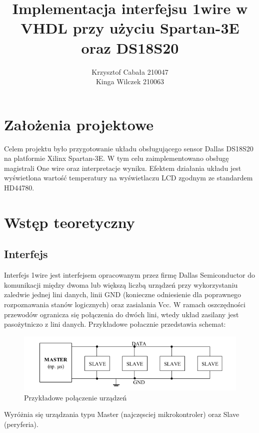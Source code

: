 \documentclass[a4paper]{article}
\title{\vspace{80mm}Implementacja interfejsu 1wire w VHDL przy użyciu Spartan-3E oraz DS18S20}
\author{Krzysztof Cabała 210047\\ Kinga Wilczek 210063\vspace{110mm}}
\begin{document}
\maketitle
\thispagestyle{empty}

\tableofcontents
\newpage
\listoffigures

\newpage

\section{Założenia projektowe}

Celem projektu było przygotowanie układu obsługującego sensor Dallas DS18S20 na platformie Xilinx Spartan-3E. W tym celu zaimplementowano obsługę magistrali One wire oraz interpretacje wyniku. Efektem działania układu jest wyświetlona wartość temperatury na wyświetlaczu LCD zgodnym ze standardem HD44780.

\section{Wstęp teoretyczny}
\subsection{Interfejs}
Interfejs 1wire jest interfejsem opracowanym przez firmę Dallas Semiconductor do komunikacji między dwoma lub większą liczbą urządzeń przy wykorzystaniu zaledwie jednej lini danych, linii GND (konieczne odniesienie dla poprawnego rozpoznawania stanów logicznych) oraz zasialania Vcc. 
W ramach oszczędności przewodów ogranicza się połączenia do dwóch lini, wtedy układ zasilany jest pasożytniczo z lini danych.
Przykładowe połacznie przedstawia schemat:

\begin{figure}[h]
\begin{center}
\includegraphics[scale=0.3]{graphics/idea.png}
\end{center}
\caption{Przykładowe połączenie urządzeń}
\label{schemonewire}
\end{figure}

Wyróżnia się urządzania typu Master (najczęsciej mikrokontroler) oraz Slave (peryferia).
\end{document}
